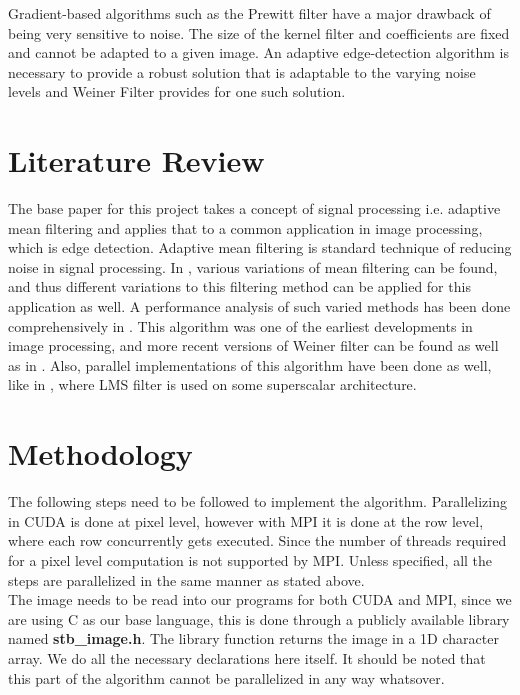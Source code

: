 \documentclass[]{article}
\begin{document}
\hspace{4mm}Gradient-based algorithms such as the Prewitt filter have a major drawback of being very sensitive to
noise. The size of the kernel filter and coefficients are fixed and cannot be adapted to a given image. An
adaptive edge-detection algorithm is necessary to provide a robust solution that is adaptable to the varying
noise levels and Weiner Filter provides for one such solution.
\section*{Literature Review}
The base paper for this project \cite{woodhall1997new} takes a concept of signal processing i.e. adaptive mean filtering and applies that to a common application in image processing, which is edge detection. Adaptive mean filtering is standard technique of reducing noise in signal processing. In \cite{weib1998adaptive}, various variations of mean filtering can be found, and thus different variations to this filtering method can be applied for this application as well. A performance analysis of such varied methods has been done comprehensively in \cite{bitmead1980performance}. This algorithm was one of the earliest developments in image processing, and more recent versions of Weiner filter can be found as well as in \cite{chen2006new}. Also, parallel implementations of this algorithm have been done as well, like in \cite{allred2003implementation}, where LMS filter is used on some superscalar architecture.
\section*{Methodology}
The following steps need to be followed to implement the algorithm. Parallelizing in CUDA is done at pixel level, however with MPI it is done at the row level, where each row concurrently gets executed. Since the number of threads required for a pixel level computation is not supported by MPI. Unless specified, all the steps are parallelized in the same manner as stated above.\\

\textbullet \hspace{4mm} The image needs to be read into our programs for both CUDA and MPI, since we are using C as our base language, this is done through a publicly available library named \textbf{stb\_image.h}. The library function returns the image in a 1D character array. We do all the necessary declarations here itself. It should be noted that this part of the algorithm cannot be parallelized in any way whatsover. \\
\end{document}
